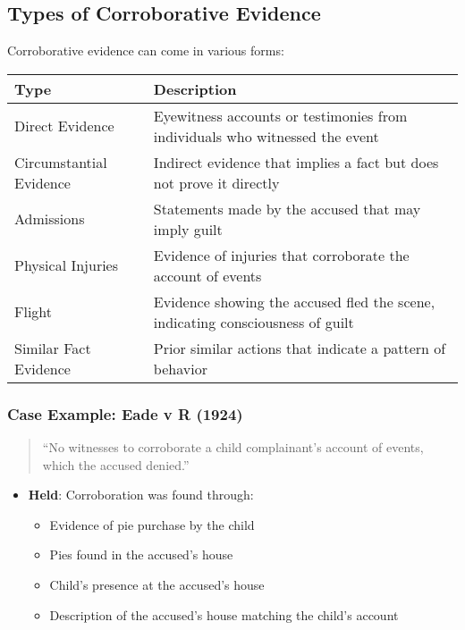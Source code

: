 \subsection{Types of Corroborative
Evidence}\label{types-of-corroborative-evidence}

Corroborative evidence can come in various forms:

\begin{longtable}[]{@{}
  >{\raggedright\arraybackslash}p{}
  >{\raggedright\arraybackslash}p{}@{}}
\toprule\noalign{}
\begin{minipage}[b]{\linewidth}\raggedright
Type
\end{minipage} & \begin{minipage}[b]{\linewidth}\raggedright
Description
\end{minipage} \\
\midrule\noalign{}
\endhead
\bottomrule\noalign{}
\endlastfoot
Direct Evidence & Eyewitness accounts or testimonies from individuals
who witnessed the event \\
Circumstantial Evidence & Indirect evidence that implies a fact but does
not prove it directly \\
Admissions & Statements made by the accused that may imply guilt \\
Physical Injuries & Evidence of injuries that corroborate the account of
events \\
Flight & Evidence showing the accused fled the scene, indicating
consciousness of guilt \\
Similar Fact Evidence & Prior similar actions that indicate a pattern of
behavior \\
\end{longtable}

\subsubsection{Case Example: Eade v R
(1924)}\label{case-example-eade-v-r-1924}

\begin{quote}
``No witnesses to corroborate a child complainant's account of events,
which the accused denied.''
\end{quote}

\begin{itemize}
\tightlist
\item
  \textbf{Held}: Corroboration was found through:

  \begin{itemize}
  \tightlist
  \item
    Evidence of pie purchase by the child
  \item
    Pies found in the accused's house
  \item
    Child's presence at the accused's house
  \item
    Description of the accused's house matching the child's account
  \end{itemize}
\end{itemize}

